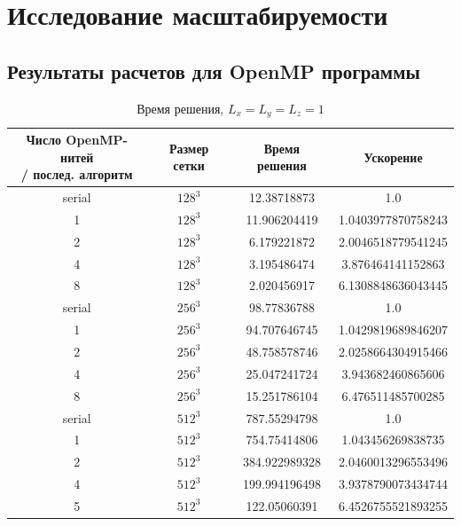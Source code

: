 \section{Исследование масштабируемости}
\label{sec:Chapter5} 

\subsection{Результаты расчетов для OpenMP программы}
\begin{table}[ht]
    \begin{tabular}{|c|c|c|c|}
        \hline
        \makecell[c]{Число OpenMP-нитей\\ / послед. алгоритм} & Размер сетки & Время решения & Ускорение \\
        \hline
        serial & \(128^3\) & 12.38718873 & 1.0 \\
        1 & \(128^3\) & 11.906204419 & 1.0403977870758243 \\
        2 & \(128^3\) & 6.179221872 & 2.0046518779541245 \\
        4 & \(128^3\) & 3.195486474 & 3.876464141152863 \\
        8 & \(128^3\) & 2.020456917 & 6.1308848636043445 \\
        \hline
        serial & \(256^3\) & 98.77836788 & 1.0 \\
        1 & \(256^3\) & 94.707646745 & 1.0429819689846207 \\
        2 & \(256^3\) & 48.758578746 & 2.0258664304915466 \\
        4 & \(256^3\) & 25.047241724 & 3.943682460865606 \\
        8 & \(256^3\) & 15.251786104 & 6.476511485700285 \\
        \hline
        serial & \(512^3\) & 787.55294798 & 1.0 \\
        1 & \(512^3\) & 754.75414806 & 1.043456269838735 \\
        2 & \(512^3\) & 384.922989328 & 2.0460013296553496 \\
        4 & \(512^3\) & 199.994196498 & 3.9378790073434744 \\
        5 & \(512^3\) & 122.05060391 & 6.4526755521893255 \\
        \hline
    \end{tabular}
    \caption{Время решения, \(L_x=L_y=L_z=1\)}
    \label{tab1}
\end{table}

